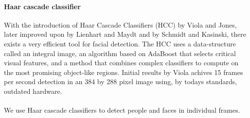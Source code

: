 \paragraph{Haar cascade classifier}
%
With the introduction of Haar Cascade Classifiers (HCC) %
by Viola and Jones\cite{viola01}, later improved upon by Lienhart and Maydt\cite{lienhart01} and by Schmidt and Kasinski\cite{schmidt01}\cite{schmidt02}, there exists a very efficient tool for facial detection. The HCC uses a data-structure called an integral image, an algorithm based on AdaBoost %
that selects critical visual features, and a method that combines complex classifiers to compute on the most promising object-like regions. Initial results by Viola achives 15 frames per second detection in an 384 by 288 pixel image using, by todays standards, outdated hardware.\\
\\
We use Haar cascade classifiers \cite{viola01}\cite{lienhart01}\cite{schmidt01}\cite{schmidt02} to detect people and faces in individual frames.
%
%
%
